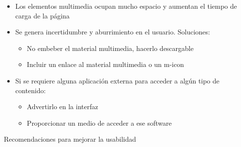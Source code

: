 \documentclass[12pt, twoside, openright]{report} %
\begin{document}
\begin{itemize}
	      \begin{itemize}
		      \item Los elementos multimedia ocupan mucho espacio y aumentan el
		            tiempo de carga de la página

		      \item Se genera incertidumbre y aburrimiento en el usuario.
		            Soluciones:

		            \begin{itemize}
			            \item No embeber el material multimedia, hacerlo descargable

			            \item Incluir un enlace al material multimedia o un m-icon
		            \end{itemize}

		      \item Si se requiere alguna aplicación externa para acceder a algún
		            tipo de contenido:

		            \begin{itemize}
			            \item Advertirlo en la interfaz

			            \item Proporcionar un medio de acceder a ese software
		            \end{itemize}
	      \end{itemize}
\end{itemize}
\pagebreak
Recomendaciones para mejorar la usabilidad
\end{document}
